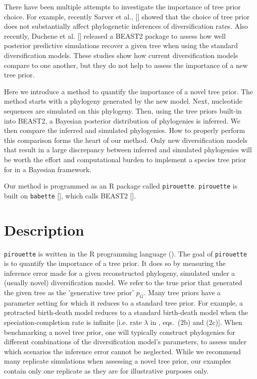 There have been multiple attempts to investigate the importance of tree
prior choice. For example, recently Sarver et al., [\cite{sarver2019choice}] 
showed that the choice of tree prior does not 
substantially affect phylogenetic inferences of diversification rates.
Also recently, Duchene et al. [\cite{duchene2018phylodynamic}] released
a BEAST2 package to assess how well posterior predictive simulations
recover a given tree when using the standard diversification models.
These studies show how current diversification models compare
to one another, but they do not help to assess 
the importance of a new tree prior. 

Here we introduce a method to quantify the importance of a novel tree prior.
The method starts with a phylogeny generated 
by the new model. 
Next, nucleotide sequences are simulated on this phylogeny. 
Then, using the tree priors built-in into BEAST2, 
a Bayesian posterior distribution of phylogenies is inferred. 
We then compare the inferred and simulated phylogenies. 
How to properly perform this comparison forms the heart of our method.
Only new diversification models that result 
in a large discrepancy between inferred and simulated phylogenies 
will be worth the effort and computational burden 
to implement a species tree prior for in a Bayesian framework.

Our method is programmed as an R package called \verb;pirouette;.
\verb;pirouette; is built on \verb;babette; [\cite{bilderbeek2018babette}], 
which calls BEAST2 [\cite{bouckaert2019beast}]. 

\section{Description}

\verb;pirouette; is written in the R programming language (\cite{R}).
The goal of \verb;pirouette; is to quantify the importance of a tree prior.
It does so by measuring the inference error made 
for a given reconstructed phylogeny, 
simulated under a (usually novel) diversification model.
We refer to the true prior that generated the given tree
as the 'generative tree prior' $\mathit{p_{G}}$.
Many tree priors have a parameter setting 
for which it reduces to a standard tree prior. 
For example, a protracted birth-death model \citep{etienne2012prolonging} 
reduces to a standard birth-death model when the speciation-completion rate 
is infinite [i.e. rate $\lambda$ in \cite{etienne2014estimating}, 
eqs.~(2b) and (2c)].
When benchmarking a novel tree prior, 
one will typically construct phylogenies 
for different combinations of the diversification model's parameters, 
to assess under which scenarios the inference error cannot be neglected. 
While we recommend many replicate simulations 
when assessing a novel tree prior, 
our examples contain only one replicate 
as they are for illustrative purposes only.

